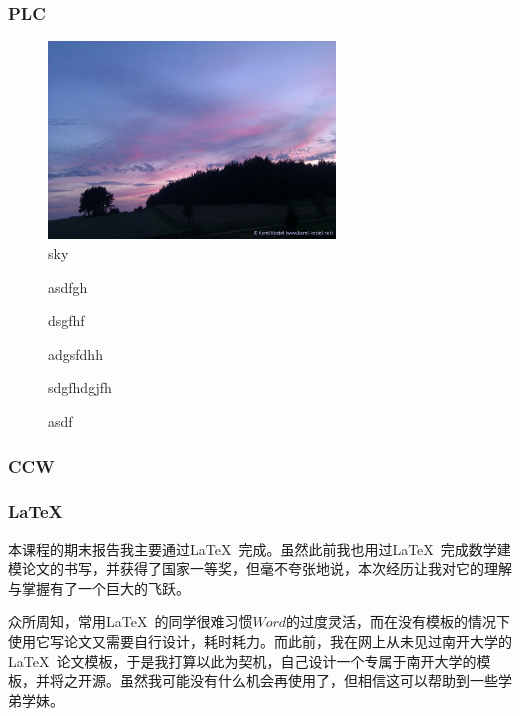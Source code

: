 \documentclass[12pt]{ctexart}
\begin{document}
\subsubsection{PLC}

\lipsum[1]
\lipsum[1]

\begin{figure}[H]
\centering
\includegraphics[width=0.68\textwidth]{sky.jpg}
\caption{sky}
\end{figure}


\lipsum[1]

\begin{description}
  \item[] asdfgh
  \item[] dsgfhf
  \item[] adgsfdhh
  \item[] sdgfhdgjfh
  \item[] asdf
\end{description}

\lipsum[1]
\lipsum[1]

\subsubsection{CCW}

\lipsum[1]

\subsubsection{\LaTeX}

本课程的期末报告我主要通过\LaTeX\ 完成。虽然此前我也用过\LaTeX\ 完成数学建模论文的书写，并获得了国家一等奖，但毫不夸张地说，本次经历让我对它的理解与掌握有了一个巨大的飞跃。

众所周知，常用\LaTeX\ 的同学很难习惯$Word$的过度灵活，而在没有模板的情况下使用它写论文又需要自行设计，耗时耗力。而此前，我在网上从未见过南开大学的\LaTeX\ 论文模板，于是我打算以此为契机，自己设计一个专属于南开大学的模板，并将之开源。虽然我可能没有什么机会再使用了，但相信这可以帮助到一些学弟学妹。
\end{document}
